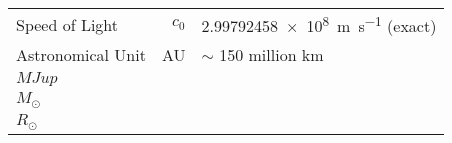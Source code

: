 \begin{constants}
    \begin{longtable}{lr@{${}={}$}l}

     Speed of Light & \(c_{0}\) & \SI{2.99792458e8}{\meter\per\second} (exact)\\
     Astronomical Unit & AU & \(\sim\) 150 million km\\
     
     \(MJup\) &  & \\
     \(M_\odot\) &  & \\
     \(R_\odot\) &  & \\
\end{longtable}
\end{constants}
